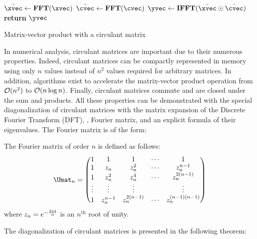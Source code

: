 \begin{algorithm}[htb]
  \begin{algorithmic}[1]
     
      \State $\tilde{\xvec} \gets \textbf{FFT}(\xvec)$
      \State $\tilde{\cvec} \gets \textbf{FFT}(\cvec)$
      \State $\yvec \gets \textbf{IFFT}(\tilde{\xvec} \odot \tilde{\cvec})$ 
      \State \textbf{return} $\yvec$ 
    \EndProcedure
  \end{algorithmic}
  \caption{Matrix-vector product with a circulant matrix}
  \label{algorithm:ch2-matrix_vector_product_circulant_matrix}
\end{algorithm}

In numerical analysis, circulant matrices are important due to their numerous properties.
Indeed, circulant matrices can be compactly represented in memory using only $n$ values instead of $n^2$ values required for arbitrary matrices.
In addition, algorithms exist to accelerate the matrix-vector product operation from $\mathcal{O}(n^2)$ to $\mathcal{O}(n \log n)$. 
Finally, circulant matrices commute and are closed under the sum and products.
All these properties can be demonstrated with the special diagonalization of circulant matrices with the matrix expansion of the Discrete Fourier Transform (DFT), \ie, Fourier matrix, and an explicit formula of their eigenvalues.
The Fourier matrix is of the form:
\begin{definition}
  The Fourier matrix of order $n$ is defined as follows:
  \begin{equation} \label{definition:ch2-fourier_matrix}
    \Umat_n = 
    \leftmatrix
      1      & 1         & 1            & \cdots & 1                \\
      1      & z_n       & z_n^2        & \cdots & z_n^{n-1}        \\
      1      & z_n^2     & z_n^4        & \cdots & z_n^{2(n-1)}     \\
      \vdots & \vdots    & \vdots       &        & \vdots           \\
      1      & z_n^{n-1} & z_n^{2(n-1)} & \cdots & z_n^{(n-1)(n-1)}
    \rightmatrix
  \end{equation}
  where $z_n = e^{-\frac{2\pi\mathbf{i}}{n}}$ is an $n^{\text{th}}$ root of unity.
\end{definition}
\noindent
The diagonalization of circulant matrices is presented in the following theorem:
